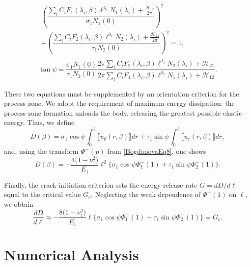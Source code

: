 \begin{equation}\label{BogdanovaEq16}
\begin{array}{l}
	\begin{multlined}
	\left(\dfrac{
	\sum_{i}C_{i}F_{1}(\lambda_{i},\beta)\ell^{\lambda_{i}}N_{1}(\lambda_{i})
	+\tfrac{\mathcal{H}_{12}}{2\pi}
}{
	\sigma_{1}N_{1}(0)
}\right)^{2}
\\[-1em]
+
\left(\dfrac{
	\sum_{i}C_{i}F_{2}(\lambda_{i},\beta)\ell^{\lambda_{i}}N_{2}(\lambda_{i})
	+\tfrac{\mathcal{H}_{21}}{2\pi}
}{
	\tau_{1}N_{2}(0)
}\right)^{2}
=1,
\end{multlined}
\\
\tan\psi
	=\dfrac{\sigma_{1}N_{1}(0)}{\tau_{1}N_{2}(0)}
	\dfrac{2\pi\sum_{i}C_{i}F_{2}(\lambda_{i},\beta)\ell^{\lambda_{i}} N_{2}(\lambda_{i})
		+\mathcal{H}_{21}}
	{2\pi\sum_{i}C_{i}F_{1}(\lambda_{i},\beta)\ell^{\lambda_{i}} N_{1}(\lambda_{i})
		+\mathcal{H}_{12}}.
\end{array}
\end{equation}

\noindent These two equations must be supplemented by an orientation criterion for the process zone.  We adopt the requirement of maximum energy dissipation: the process‐zone formation unloads the body, releasing the greatest possible elastic energy.  Thus, we define
\[
D(\beta)
= \sigma_{1}\cos\psi
\int_{0}^{\ell}  \llbracket u_{\theta}(r,\beta)\rrbracket dr
+ \tau_{1}\sin\psi
\int_{0}^{\ell}  \llbracket u_{r}(r,\beta)\rrbracket dr,
\]
and, using the transform \(\Phi^{-}(p)\) from \eqref{BogdanovaEq8}, one shows
\begin{equation}\label{BogdanovaEq17}
	D(\beta)
	= -\frac{4\big(1-\nu_{1}^{2}\big)}{E_{1}}\ell^{2}
	\bigl\{
	\sigma_{1}\cos\psi\Phi_{1}^{-}(1)
	+\tau_{1}\sin\psi\Phi_{2}^{-}(1)
	\bigr\}.
\end{equation}

Finally, the crack‐initiation criterion sets the energy‐release rate \(G=dD/d\ell\) equal to the critical value \(G_{c}\).  Neglecting the weak dependence of \(\Phi^{-}(1)\) on \(\ell\), we obtain
\begin{equation}\label{BogdanovaEq18}
	\frac{dD}{d\ell}
	\approx -\frac{8\big(1-\nu_{1}^{2}\big)}{E_{1}}\ell
	\bigl\{
	\sigma_{1}\cos\psi \Phi_{1}^{-}(1)
	+\tau_{1}\sin\psi \Phi_{2}^{-}(1)
	\bigr\}
	= G_{c}.
\end{equation}

\section{Numerical Analysis}
\label{BogdanovaSec5}

